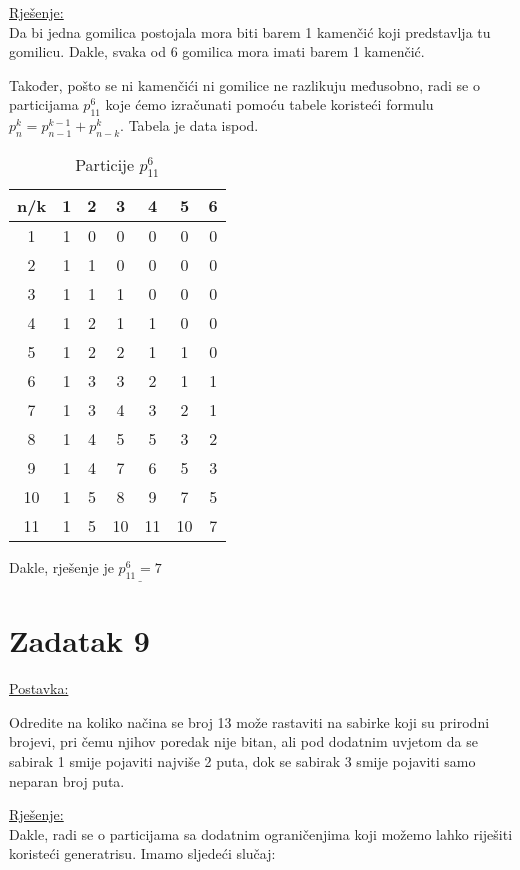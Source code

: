 \documentclass[12pt]{article}
\begin{document}
\underline{Rješenje:}\\

Da bi jedna gomilica postojala mora biti barem 1 kamenčić koji predstavlja tu gomilicu. Dakle, svaka od 6 gomilica mora imati barem 1 kamenčić. 

Također, pošto se ni kamenčići ni gomilice ne razlikuju međusobno, radi se o particijama $p_{11}^6$ koje ćemo izračunati pomoću tabele koristeći formulu $p_{n}^k = p_{n-1}^{k-1} + p_{n-k}^{k}$. Tabela je data ispod.
\newpage
\begin{table}[]
\centering
\caption{Particije $p_{11}^6$}
\label{my-label}
\begin{tabular}{@{}c|cccccc@{}}
n/k & 1 & 2 & 3  & 4  & 5  & 6 \\ \midrule
1   & 1 & 0 & 0  & 0  & 0  & 0 \\
2   & 1 & 1 & 0  & 0  & 0  & 0 \\
3   & 1 & 1 & 1  & 0  & 0  & 0 \\
4   & 1 & 2 & 1  & 1  & 0  & 0 \\
5   & 1 & 2 & 2  & 1  & 1  & 0 \\
6   & 1 & 3 & 3  & 2  & 1  & 1 \\
7   & 1 & 3 & 4  & 3  & 2  & 1 \\
8   & 1 & 4 & 5  & 5  & 3  & 2 \\
9   & 1 & 4 & 7  & 6  & 5  & 3 \\
10  & 1 & 5 & 8  & 9  & 7  & 5 \\
11  & 1 & 5 & 10 & 11 & 10 & 7
\end{tabular}
\end{table}

Dakle, rješenje je $\underline{p_{11}^6 = 7}$

\newpage
\newpage
\section*{Zadatak 9\label{Z9}}	 

\underline{Postavka:}

Odredite na koliko načina se broj 13 može rastaviti na sabirke koji su prirodni brojevi, pri čemu njihov poredak nije bitan, ali pod dodatnim uvjetom da se sabirak 1 smije pojaviti najviše 2 puta, dok se sabirak 3 smije pojaviti samo neparan broj puta.

\underline{Rješenje:}\\

Dakle, radi se o particijama sa dodatnim ograničenjima koji možemo lahko riješiti koristeći generatrisu. Imamo sljedeći slučaj:
\end{document}
